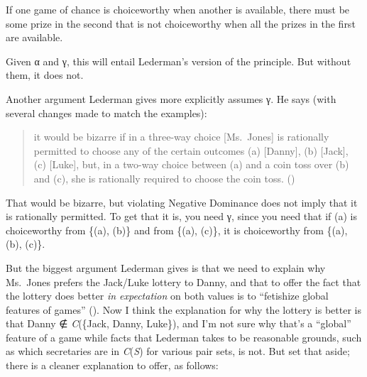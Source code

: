 \documentclass[
  11pt,
  letterpaper,
  DIV=11,
  numbers=noendperiod,
  twoside]{scrartcl}
\providecommand{\tightlist}{%
  \setlength{\itemsep}{0pt}\setlength{\parskip}{0pt}}
\begin{document}
\begin{description}
\tightlist
\item[Negative Dominance for Choices]
If one game of chance is choiceworthy when another is available, there
must be some prize in the second that is not choiceworthy when all the
prizes in the first are available.
\end{description}

Given α and γ, this will entail Lederman's version of the principle. But
without them, it does not.

Another argument Lederman gives more explicitly assumes γ. He says (with
several changes made to match the examples):

\begin{quote}
it would be bizarre if in a three-way choice {[}Ms.~Jones{]} is
rationally permitted to choose any of the certain outcomes (a)
{[}Danny{]}, (b) {[}Jack{]}, (c) {[}Luke{]}, but, in a two-way choice
between (a) and a coin toss over (b) and (c), she is rationally required
to choose the coin toss. ()
\end{quote}

That would be bizarre, but violating Negative Dominance does not imply
that it is rationally permitted. To get that it is, you need γ, since
you need that if (a) is choiceworthy from \{(a), (b)\} and from \{(a),
(c)\}, it is choiceworthy from \{(a), (b), (c)\}.

But the biggest argument Lederman gives is that we need to explain why
Ms.~Jones prefers the Jack/Luke lottery to Danny, and that to offer the
fact that the lottery does better \emph{in expectation} on both values
is to ``fetishize global features of games''
(). Now I think the
explanation for why the lottery is better is that Danny ∉
\emph{C}(\{Jack, Danny, Luke\}), and I'm not sure why that's a
``global'' feature of a game while facts that Lederman takes to be
reasonable grounds, such as which secretaries are in \emph{C}(\emph{S})
for various pair sets, is not. But set that aside; there is a cleaner
explanation to offer, as follows:
\end{document}
